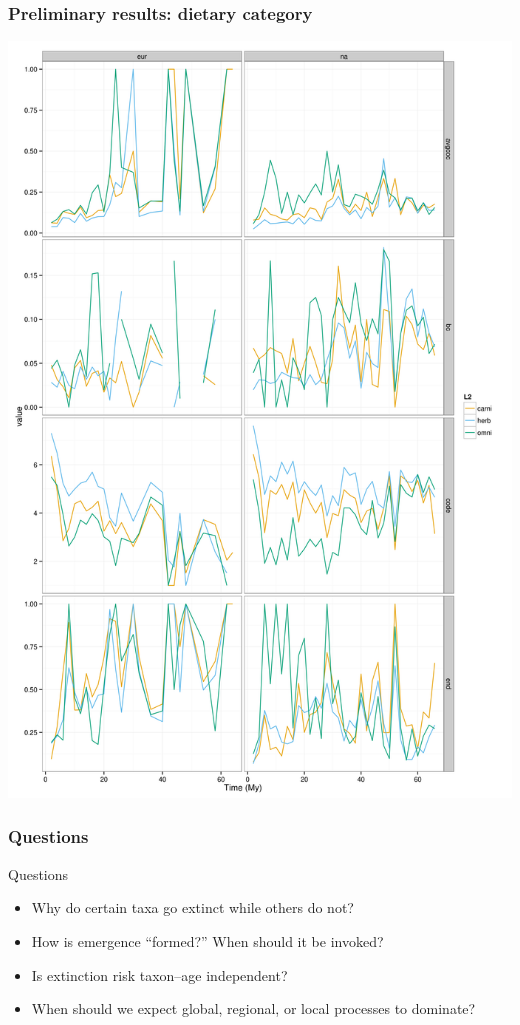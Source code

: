 \documentclass{beamer} \usepackage{amsmath,amsthm}
\begin{document}
\begin{frame}
  \frametitle{Preliminary results: dietary category}

  \begin{center}
    \includegraphics[height = 0.8\textheight, width = \textwidth, keepaspectratio = true]{figure/diets}
  \end{center}
\end{frame}


\begin{frame}
  \frametitle{Questions}

  \begin{alertblock}{Questions}
    \begin{itemize}
      \item Why do certain taxa go extinct while others do not?
      \item How is emergence ``formed?'' When should it be invoked?
      \item Is extinction risk taxon--age independent?
      \item When should we expect global, regional, or local processes to dominate?
    \end{itemize}
  \end{alertblock}
\end{frame}
\end{document}

